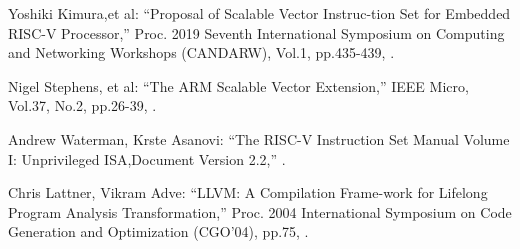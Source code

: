 \documentclass[a4paper,9pt, twocolumn]{jarticle}
\begin{document}
%
%
\begin{thebibliography}{9}
\itemsep -1.7pt

{\small Yoshiki Kimura,et al:      %
\newblock ``Proposal of Scalable Vector Instruc-tion Set for Embedded RISC-V Processor,''
\newblock Proc. 2019 Seventh International Symposium on Computing and Networking Workshops (CANDARW),
\newblock Vol.1,
\newblock pp.435-439,
.}

{\small Nigel Stephens, et al:      %
\newblock ``The ARM Scalable Vector Extension,''
\newblock IEEE Micro,
\newblock Vol.37,
\newblock No.2,
\newblock pp.26-39,
.}

{\small Andrew Waterman, Krste Asanovi:      %
\newblock ``The RISC-V Instruction Set Manual Volume I: Unprivileged ISA,Document Version 2.2,''
.}

{\small Chris Lattner, Vikram Adve:      %
\newblock ``LLVM: A Compilation Frame-work for Lifelong Program Analysis Transformation,''
\newblock Proc. 2004 International Symposium on Code Generation and Optimization (CGO’04),
\newblock pp.75,
.}

\end{thebibliography}
\end{document}
